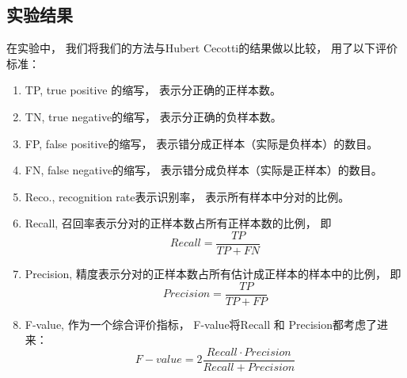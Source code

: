 \subsection{实验结果}
在实验中， 我们将我们的方法与Hubert Cecotti的结果做以比较， 用了以下评价标准：
\begin{enumerate}
	\item TP,
	true positive 的缩写， 表示分正确的正样本数。

	\item TN,
	true negative的缩写， 表示分正确的负样本数。

	\item FP,
	false positive的缩写， 表示错分成正样本（实际是负样本）的数目。

	\item FN,
	false negative的缩写， 表示错分成负样本（实际是正样本）的数目。

	\item Reco.,
	recognition rate表示识别率， 表示所有样本中分对的比例。

	\item Recall,
	召回率表示分对的正样本数占所有正样本数的比例， 即
	\begin{equation}
		Recall = \frac{TP}{TP+FN}
	\end{equation}

	\item Precision,
	精度表示分对的正样本数占所有估计成正样本的样本中的比例， 即
	\begin{equation}
		Precision = \frac{TP}{TP+FP}
	\end{equation}

	\item F-value,
	作为一个综合评价指标， F-value将Recall 和 Precision都考虑了进来：
	\begin{equation}
		F-value = 2\frac{Recall \cdot Precision}{Recall+Precision}
	\end{equation}
\end{enumerate}


